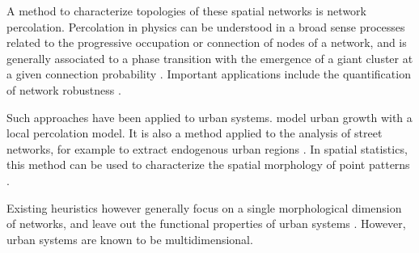 \documentclass{jimis-en}
\begin{document}
\cite{lagesse2015spatial} %





A method to characterize topologies of these spatial networks is network percolation. Percolation in physics can be understood in a broad sense processes related to the progressive occupation or connection of nodes of a network, and is generally associated to a phase transition with the emergence of a giant cluster at a given connection probability \citep{stauffer2014introduction}. Important applications include the quantification of network robustness \citep{callaway2000network}.


Such approaches have been applied to urban systems. \cite{makse1998modeling} model urban growth with a local percolation model. It is also a method applied to the analysis of street networks, for example to extract endogenous urban regions \citep{arcaute2016cities}. In spatial statistics, this method can be used to characterize the spatial morphology of point patterns \cite{huynh2018characterisation}.


\cite{piovani2017urban} %






Existing heuristics however generally focus on a single morphological dimension of networks, and leave out the functional properties of urban systems \citep{burger2012form}. However, urban systems are known to be multidimensional.
\end{document}
